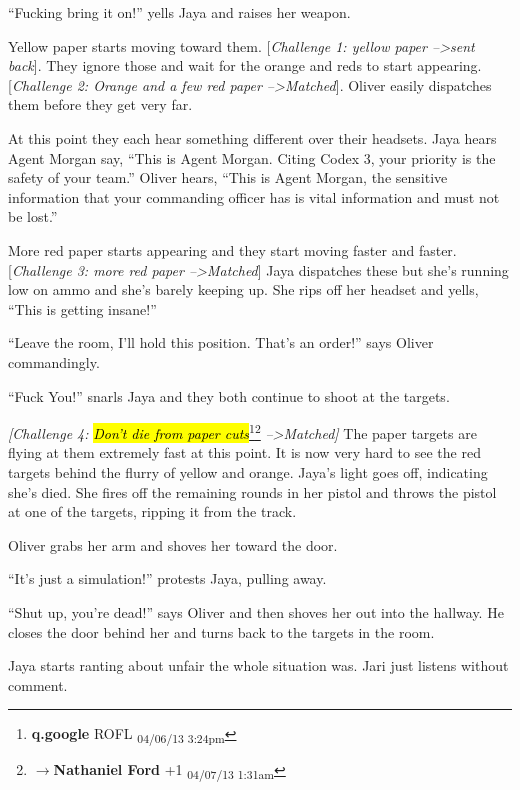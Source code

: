 ``Fucking bring it on!'' yells Jaya and raises her weapon.



Yellow paper starts moving toward them.  {[}\textit{Challenge 1: yellow paper --\textgreater  sent back}{]}.  They ignore those and wait for the orange and reds to start appearing.  {[}\textit{Challenge 2: Orange and a few red paper --\textgreater  Matched}{]}.  Oliver easily dispatches them before they get very far. 



At this point they each hear something different over their headsets.  Jaya hears Agent Morgan say, ``This is Agent Morgan.  Citing Codex 3, your priority is the safety of your team.''  Oliver hears, ``This is Agent Morgan, the sensitive information that your commanding officer has is vital information and must not be lost.''



More red paper starts appearing and they start moving faster and faster.  {[}\textit{Challenge 3: more red paper --\textgreater  Matched}{]}  Jaya dispatches these but she's running low on ammo and she's barely keeping up.  She rips off her headset and yells, ``This is getting insane!''

``Leave the room, I'll hold this position.   That's an order!'' says Oliver commandingly.

``Fuck You!'' snarls Jaya and they both continue to shoot at the targets.



\textit{{[}Challenge 4: }\textit{\hl{Don't die from paper cuts}}\footnote{\textbf{q.google }  ROFL \textsubscript{04/06/13 3:24pm}}\footnote{$\rightarrow$\textbf{Nathaniel Ford }+1 \textsubscript{04/07/13 1:31am}}\textit{ --\textgreater  Matched{]}}  The paper targets are flying at them extremely fast at this point.  It is now very hard to see the red targets behind the flurry of yellow and orange.  Jaya's light goes off, indicating she's died.  She fires off the remaining rounds in her pistol and throws the pistol at one of the targets, ripping it from the track.  

Oliver grabs her arm and shoves her toward the door.

``It's just a simulation!'' protests Jaya, pulling away.

``Shut up, you're dead!'' says Oliver and then shoves her out into the hallway.  He closes the door behind her and turns back to the targets in the room.

Jaya starts ranting about unfair the whole situation was.  Jari just listens without comment.



